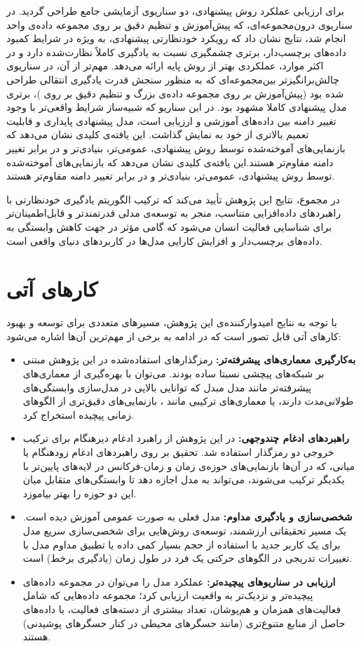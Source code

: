 برای ارزیابی عملکرد روش پیشنهادی، دو سناریوی آزمایشی جامع طراحی گردید. در سناریوی درون‌مجموعه‌ای، که پیش‌آموزش و تنظیم دقیق بر روی مجموعه داده‌ی واحد  انجام شد، نتایج نشان داد که رویکرد خودنظارتی پیشنهادی، به ویژه در شرایط کمبود داده‌های برچسب‌دار، برتری چشمگیری نسبت به یادگیری کاملاً نظارت‌شده دارد و در اکثر موارد، عملکردی بهتر از روش پایه ارائه می‌دهد. مهم‌تر از آن، در سناریوی چالش‌برانگیزتر بین‌مجموعه‌ای که به منظور سنجش قدرت یادگیری انتقالی طراحی شده بود (پیش‌آموزش بر روی مجموعه داده‌ی بزرگ  و تنظیم دقیق بر روی )، برتری مدل پیشنهادی کاملا مشهود بود. در این سناریو که شبیه‌ساز شرایط واقعی‌تر با وجود تغییر دامنه بین داده‌های آموزشی و ارزیابی است، مدل پیشنهادی پایداری و قابلیت تعمیم بالاتری از خود به نمایش گذاشت. این یافته‌ی کلیدی نشان می‌دهد که بازنمایی‌های آموخته‌شده توسط روش پیشنهادی، عمومی‌تر، بنیادی‌تر و در برابر تغییر دامنه مقاوم‌تر هستند.این یافته‌ی کلیدی نشان می‌دهد که بازنمایی‌های آموخته‌شده توسط روش پیشنهادی، عمومی‌تر، بنیادی‌تر و در برابر تغییر دامنه مقاوم‌تر هستند.

در مجموع، نتایج این پژوهش تأیید می‌کند که ترکیب الگوریتم یادگیری خودنظارتی  با راهبردهای داده‌افزایی متناسب، منجر به توسعه‌ی مدلی قدرتمندتر و قابل‌اطمینان‌تر برای شناسایی فعالیت انسان می‌شود که گامی مؤثر در جهت کاهش وابستگی به داده‌های برچسب‌دار و افزایش کارایی مدل‌ها در کاربردهای دنیای واقعی است.

\section{کارهای آتی}

با توجه به نتایج امیدوارکننده‌ی این پژوهش، مسیرهای متعددی برای توسعه و بهبود کارهای آتی قابل تصور است که در ادامه به برخی از مهم‌ترین آن‌ها اشاره می‌شود:
\begin{itemize}
    \item \textbf{به‌کارگیری معماری‌های پیشرفته‌تر:} رمزگذار‌های استفاده‌شده در این پژوهش مبتنی بر شبکه‌های پیچشی نسبتا ساده بودند. می‌توان با بهره‌گیری از معماری‌های پیشرفته‌تر مانند مدل مبدل که توانایی بالایی در مدل‌سازی وابستگی‌های طولانی‌مدت دارند، یا معماری‌های ترکیبی مانند ، بازنمایی‌های دقیق‌تری از الگوهای زمانی پیچیده استخراج کرد.
    \item \textbf{راهبردهای ادغام چندوجهی:} در این پژوهش از راهبرد ادغام دیرهنگام برای ترکیب خروجی دو رمزگذار استفاده شد. تحقیق بر روی راهبردهای ادغام زودهنگام یا میانی، که در آن‌ها بازنمایی‌های حوزه‌ی زمان و زمان-فرکانس در لایه‌های پایین‌تر با یکدیگر ترکیب می‌شوند، می‌تواند به مدل اجازه دهد تا وابستگی‌های متقابل میان این دو حوزه را بهتر بیاموزد.
    \item \textbf{شخصی‌سازی و یادگیری مداوم:} مدل فعلی به صورت عمومی آموزش دیده است. یک مسیر تحقیقاتی ارزشمند، توسعه‌ی روش‌هایی برای شخصی‌سازی سریع مدل برای یک کاربر جدید با استفاده از حجم بسیار کمی داده یا تطبیق مداوم مدل با تغییرات تدریجی در الگوهای حرکتی یک فرد در طول زمان (یادگیری برخط) است.
    \item \textbf{ارزیابی در سناریوهای پیچیده‌تر:} عملکرد مدل را می‌توان در مجموعه داده‌های پیچیده‌تر و نزدیک‌تر به واقعیت ارزیابی کرد؛ مجموعه داده‌هایی که شامل فعالیت‌های همزمان و هم‌پوشان، تعداد بیشتری از دسته‌های فعالیت، یا داده‌های حاصل از منابع متنوع‌تری (مانند حسگرهای محیطی در کنار حسگرهای پوشیدنی) هستند.
\end{itemize}
